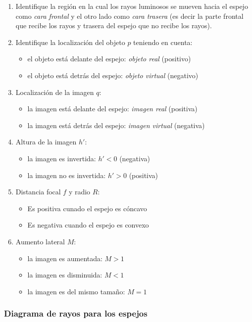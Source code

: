 \begin{enumerate}
  \item Identifique la región en la cual los rayos luminosos se mueven hacia el espejo como \textit{cara frontal} y el otro lado como \textit{cara trasera} (es decir la parte frontal que recibe los rayos y trasera del espejo que no recibe los rayos).
  \item Identifique la localización del objeto \(p\) teniendo en cuenta:
    \begin{itemize}
      \item el objeto está delante del espejo: \textit{objeto real} (positivo)
      \item el objeto está detrás del espejo: \textit{objeto virtual} (negativo)
    \end{itemize}
  \item  Localización de la imagen \(q\):
    \begin{itemize}
      \item la imagen está delante del espejo: \textit{imagen real} (positiva)
      \item la imagen está detrás del espejo: \textit{imagen virtual} (negativa)
    \end{itemize}
  \item Altura de la imagen \(h'\):
    \begin{itemize}
      \item la imagen es invertida: \(h' < 0\) (negativa)
      \item la imagen no es invertida: \(h' > 0\) (positiva)
    \end{itemize}
  \item Distancia focal \(f\) y radio \(R\):
    \begin{itemize}
      \item Es positiva cunado el espejo es cóncavo
      \item Es negativa cuando el espejo es convexo
    \end{itemize}
  \item Aumento lateral \(M\):
    \begin{itemize}
      \item la imagen es aumentada: \(M > 1\)
      \item la imagen es disminuida: \(M < 1\)
      \item la imagen es del mismo tamaño: \(M = 1\)
    \end{itemize}
\end{enumerate}

\subsubsection{Diagrama de rayos para los espejos}

